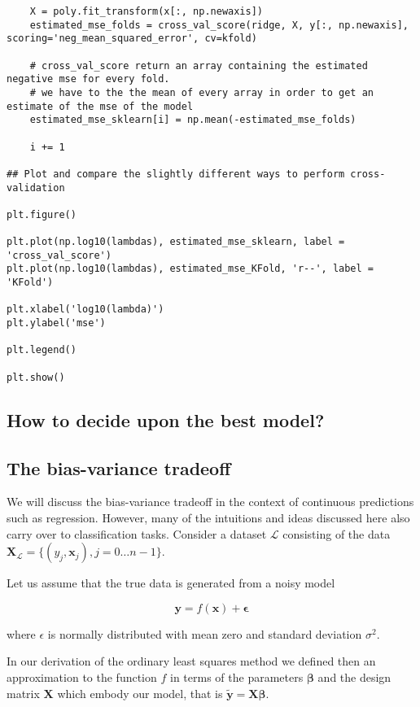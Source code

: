 \documentclass[%
oneside,                 %
final,                   %
10pt]{article}
\begin{document}
\begin{verbatim}
    X = poly.fit_transform(x[:, np.newaxis])
    estimated_mse_folds = cross_val_score(ridge, X, y[:, np.newaxis], scoring='neg_mean_squared_error', cv=kfold)

    # cross_val_score return an array containing the estimated negative mse for every fold.
    # we have to the the mean of every array in order to get an estimate of the mse of the model
    estimated_mse_sklearn[i] = np.mean(-estimated_mse_folds)

    i += 1

## Plot and compare the slightly different ways to perform cross-validation

plt.figure()

plt.plot(np.log10(lambdas), estimated_mse_sklearn, label = 'cross_val_score')
plt.plot(np.log10(lambdas), estimated_mse_KFold, 'r--', label = 'KFold')

plt.xlabel('log10(lambda)')
plt.ylabel('mse')

plt.legend()

plt.show()

\end{verbatim}

\subsection*{How to decide upon the best model?}

\subsection*{The bias-variance tradeoff}


We will discuss the bias-variance tradeoff in the context of
continuous predictions such as regression. However, many of the
intuitions and ideas discussed here also carry over to classification
tasks. Consider a dataset $\mathcal{L}$ consisting of the data
$\mathbf{X}_\mathcal{L}=\{(y_j, \boldsymbol{x}_j), j=0\ldots n-1\}$. 

Let us assume that the true data is generated from a noisy model

\[
\bm{y}=f(\boldsymbol{x}) + \bm{\epsilon}
\]

where $\epsilon$ is normally distributed with mean zero and standard deviation $\sigma^2$.

In our derivation of the ordinary least squares method we defined then
an approximation to the function $f$ in terms of the parameters
$\bm{\beta}$ and the design matrix $\bm{X}$ which embody our model,
that is $\bm{\tilde{y}}=\bm{X}\bm{\beta}$. 
\end{document}
